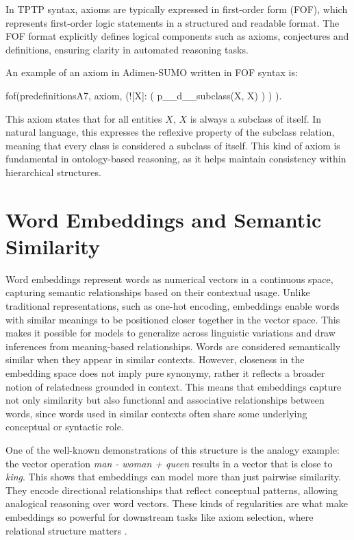 \documentclass[english,version-2020-11]{uzl-thesis}
\begin{document}
In TPTP syntax, axioms are typically expressed in first-order form (FOF), which represents first-order logic statements in a structured and readable format. The FOF format explicitly defines logical components such as axioms, conjectures and definitions, ensuring clarity in automated reasoning tasks. 

\newpage

An example of an axiom in Adimen-SUMO written in FOF syntax is:

\begin{Pseudocode}[morekeywords = {add, create}, deletekeywords={to}, numbers=left,
    caption = {Axiom example Adimen-SUMO}]
    fof(predefinitionsA7, axiom,
        (![X]: 
            (
                p__d__subclass(X, X)
            )
        )
    ).
\end{Pseudocode}

This axiom states that for all entities \( X \), \( X \) is always a subclass of itself. In natural language, this expresses the reflexive property of the subclass relation, meaning that every class is considered a subclass of itself. This kind of axiom is fundamental in ontology-based reasoning, as it helps maintain consistency within hierarchical structures.

\section{Word Embeddings and Semantic Similarity}

Word embeddings represent words as numerical vectors in a continuous space, capturing semantic relationships based on their contextual usage. Unlike traditional representations, such as one-hot encoding, embeddings enable words with similar meanings to be positioned closer together in the vector space. This makes it possible for models to generalize across linguistic variations and draw inferences from meaning-based relationships.
Words are considered semantically similar when they appear in similar contexts. However, closeness in the embedding space does not imply pure synonymy, rather it reflects a broader notion of relatedness grounded in context. This means that embeddings capture not only similarity but also functional and associative relationships between words, since words used in similar contexts often share some underlying conceptual or syntactic role.

One of the well-known demonstrations of this structure is the analogy example: the vector operation \textit{man - woman + queen} results in a vector that is close to \textit{king}. This shows that embeddings can model more than just pairwise similarity. They encode directional relationships that reflect conceptual patterns, allowing analogical reasoning over word vectors. These kinds of regularities are what make embeddings so powerful for downstream tasks like axiom selection, where relational structure matters \cite{Mikolov2013}.
\end{document}
